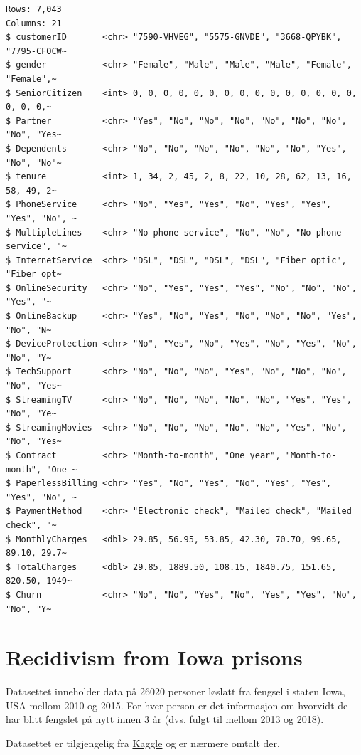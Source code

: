 \documentclass[
  letterpaper,
  DIV=11,
  numbers=noendperiod]{scrreprt}
\theoremstyle{definition}
\theoremstyle{remark}
\begin{document}
\begin{verbatim}
Rows: 7,043
Columns: 21
$ customerID       <chr> "7590-VHVEG", "5575-GNVDE", "3668-QPYBK", "7795-CFOCW~
$ gender           <chr> "Female", "Male", "Male", "Male", "Female", "Female",~
$ SeniorCitizen    <int> 0, 0, 0, 0, 0, 0, 0, 0, 0, 0, 0, 0, 0, 0, 0, 0, 0, 0,~
$ Partner          <chr> "Yes", "No", "No", "No", "No", "No", "No", "No", "Yes~
$ Dependents       <chr> "No", "No", "No", "No", "No", "No", "Yes", "No", "No"~
$ tenure           <int> 1, 34, 2, 45, 2, 8, 22, 10, 28, 62, 13, 16, 58, 49, 2~
$ PhoneService     <chr> "No", "Yes", "Yes", "No", "Yes", "Yes", "Yes", "No", ~
$ MultipleLines    <chr> "No phone service", "No", "No", "No phone service", "~
$ InternetService  <chr> "DSL", "DSL", "DSL", "DSL", "Fiber optic", "Fiber opt~
$ OnlineSecurity   <chr> "No", "Yes", "Yes", "Yes", "No", "No", "No", "Yes", "~
$ OnlineBackup     <chr> "Yes", "No", "Yes", "No", "No", "No", "Yes", "No", "N~
$ DeviceProtection <chr> "No", "Yes", "No", "Yes", "No", "Yes", "No", "No", "Y~
$ TechSupport      <chr> "No", "No", "No", "Yes", "No", "No", "No", "No", "Yes~
$ StreamingTV      <chr> "No", "No", "No", "No", "No", "Yes", "Yes", "No", "Ye~
$ StreamingMovies  <chr> "No", "No", "No", "No", "No", "Yes", "No", "No", "Yes~
$ Contract         <chr> "Month-to-month", "One year", "Month-to-month", "One ~
$ PaperlessBilling <chr> "Yes", "No", "Yes", "No", "Yes", "Yes", "Yes", "No", ~
$ PaymentMethod    <chr> "Electronic check", "Mailed check", "Mailed check", "~
$ MonthlyCharges   <dbl> 29.85, 56.95, 53.85, 42.30, 70.70, 99.65, 89.10, 29.7~
$ TotalCharges     <dbl> 29.85, 1889.50, 108.15, 1840.75, 151.65, 820.50, 1949~
$ Churn            <chr> "No", "No", "Yes", "No", "Yes", "Yes", "No", "No", "Y~
\end{verbatim}

\hypertarget{recidivism-from-iowa-prisons}{%
\section{Recidivism from Iowa
prisons}\label{recidivism-from-iowa-prisons}}

Datasettet inneholder data på 26020 personer løslatt fra fengsel i
staten Iowa, USA mellom 2010 og 2015. For hver person er det informasjon
om hvorvidt de har blitt fengslet på nytt innen 3 år (dvs. fulgt til
mellom 2013 og 2018).

Datasettet er tilgjengelig fra
\href{https://www.kaggle.com/datasets/slonnadube/recidivism-for-offenders-released-from-prison}{Kaggle}
og er nærmere omtalt der.
\end{document}
